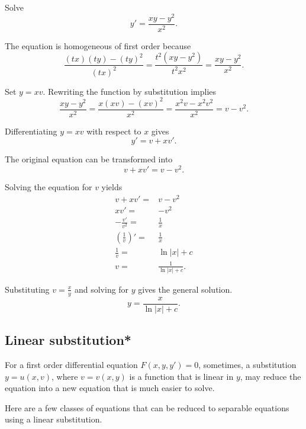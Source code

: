 \begin{exercise}
  Solve
  \[
  y'=\frac{xy-y^2}{x^2} .
  \]
\end{exercise}
\begin{exersol}
  \begin{steps}
    \item
  The equation is homogeneous of first order because
  \[\frac{(tx)(ty)-(ty)^2}{(tx)^2}=\frac{t^2(xy-y^2)}{t^2x^2}=\frac{xy-y^2}{x^2}.\]

\item 
  Set $y=xv$. Rewriting the function by substitution implies
  \[\frac{xy-y^2}{x^2}=\frac{x(xv)-(xv)^2}{x^2}=\frac{x^2v-x^2v^2}{x^2}=v-v^2.\]
  
  \item Differentiating $y=xv$ with respect to $x$ gives
  \[y' = v+xv'.\]
  
  \item The original equation can be transformed into
  \[v+xv' = v-v^2.\]

\item Solving the equation for $v$ yields
   \[
   \begin{aligned}
    v+xv' =& v-v^2\\
    xv'= & -v^2\\
    -\frac{v'}{v^2}=&\frac1x\\
    \left(\frac{1}{v}\right)'=&\frac1x\\
    \frac1v=&\ln|x|+c\\
    v=&\frac1{\ln|x|+c}.
    \end{aligned} 
   \]

   
   \item Substituting $v=\frac xy$ and solving for $y$ gives the general solution.
  \[y = \frac{x}{\ln |x| +c}.\]
\end{steps}
\end{exersol}

\subsection{Linear substitution*}

For a first order differential equation $F(x, y, y')=0$, sometimes, a substitution $y=u(x, v)$, where $v=v(x, y)$ is a function that is linear in $y$, may reduce the equation into a new equation that is much easier to solve.

Here are a few classes of equations that can be reduced to separable equations using a linear substitution.

